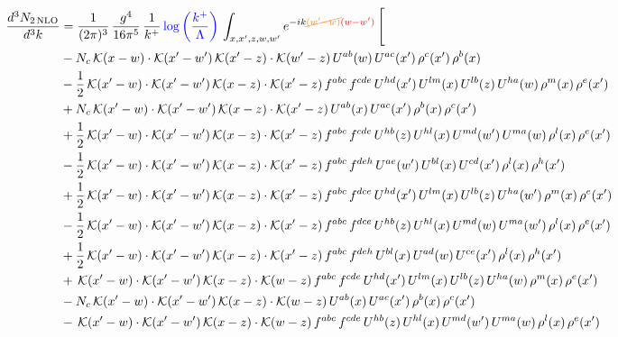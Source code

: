 \documentclass[9pt]{article}
\numberwithin{equation}{section}
\begin{document}
\begin{align}
\frac{d^{3}N_{2\,\mathrm{NLO}}}{d^{3}k} & = \frac{1}{(2\pi)^{3}}\,\frac{g^{4}}{16\pi^{5}}\,\frac{1}{k^{+}}\,{\color{blue}\log{\left(\frac{k^{+}}{\Lambda}\right)}}\,\int_{x,x',z,w,w'}e^{-ik{\color{orange}\cancel{(w'-w)}}{\color{red}(w-w')}}\,\Bigg[\notag\\ & -N_{c}\,\mathcal{K}(x-w)\cdot\mathcal{K}(x'-w')\,\mathcal{K}(x'-z)\cdot\mathcal{K}(w'-z)\,U^{ab}(w)\,U^{ac}(x')\,\rho^{c}(x')\,\rho^{b}(x)\notag\\
& -\frac{1}{2}\,\mathcal{K}(x'-w)\cdot\mathcal{K}(x'-w')\,\mathcal{K}(x-z)\cdot\mathcal{K}(x'-z)\,f^{abc}\,f^{cde}\,U^{hd}(x')\,U^{lm}(x)\,U^{lb}(z)\,U^{ha}(w)\,\rho^{m}(x)\,\rho^{e}(x')\notag\\
& +N_{c}\,\mathcal{K}(x'-w)\cdot\mathcal{K}(x'-w')\,\mathcal{K}(x-z)\cdot\mathcal{K}(x'-z)\,U^{ab}(x)\,U^{ac}(x')\,\rho^{b}(x)\,\rho^{c}(x')\notag\\
& +\frac{1}{2}\,\mathcal{K}(x'-w)\cdot\mathcal{K}(x'-w')\,\mathcal{K}(x-z)\cdot\mathcal{K}(x'-z)\,f^{abc}\,f^{cde}\,U^{hb}(z)\,U^{hl}(x)\,U^{md}(w')\,U^{ma}(w)\,\rho^{l}(x)\,\rho^{e}(x')\notag\\
& -\frac{1}{2}\,\mathcal{K}(x'-w)\cdot\mathcal{K}(x'-w')\,\mathcal{K}(x-z)\cdot\mathcal{K}(x'-z)\,f^{abc}\,f^{deh}\,U^{ae}(w')\,U^{bl}(x)\,U^{cd}(x')\,\rho^{l}(x)\,\rho^{h}(x')\notag \\ & +\frac{1}{2}\,\mathcal{K}(x'-w)\cdot\mathcal{K}(x'-w')\,\mathcal{K}(x-z)\cdot\mathcal{K}(x'-z)\,f^{abc}\,f^{dce}\,U^{hd}(x')\,U^{lm}(x)\,U^{lb}(z)\,U^{ha}(w')\,\rho^{m}(x)\,\rho^{e}(x')\notag\\
& -\frac{1}{2}\,\mathcal{K}(x'-w)\cdot\mathcal{K}(x'-w')\,\mathcal{K}(x-z)\cdot\mathcal{K}(x'-z)\,f^{abc}\,f^{dce}\,U^{hb}(z)\,U^{hl}(x)\,U^{md}(w)\,U^{ma}(w')\,\rho^{l}(x)\,\rho^{e}(x')\notag\\
& +\frac{1}{2}\,\mathcal{K}(x'-w)\cdot\mathcal{K}(x'-w')\,\mathcal{K}(x-z)\cdot\mathcal{K}(x'-z)\,f^{abc}\,f^{deh}\,U^{bl}(x)\,U^{ad}(w)\,U^{ce}(x')\,\rho^{l}(x)\,\rho^{h}(x')\notag\\
& +\,\mathcal{K}(x'-w)\cdot\mathcal{K}(x'-w')\,\mathcal{K}(x-z)\cdot\mathcal{K}(w-z)\,f^{abc}\,f^{cde}\,U^{hd}(x')\,U^{lm}(x)\,U^{lb}(z)\,U^{ha}(w)\,\rho^{m}(x)\,\rho^{e}(x')\notag\\
& -N_{c}\,\mathcal{K}(x'-w)\cdot\mathcal{K}(x'-w')\,\mathcal{K}(x-z)\cdot\mathcal{K}(w-z)\,U^{ab}(x)\,U^{ac}(x')\,\rho^{b}(x)\,\rho^{c}(x')\notag\\
& -\,\mathcal{K}(x'-w)\cdot\mathcal{K}(x'-w')\,\mathcal{K}(x-z)\cdot\mathcal{K}(w-z)\,f^{abc}\,f^{cde}\,U^{hb}(z)\,U^{hl}(x)\,U^{md}(w')\,U^{ma}(w)\,\rho^{l}(x)\,\rho^{e}(x')\notag\\

\end{align}
\end{document}
